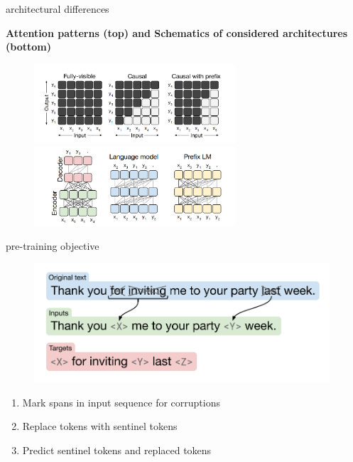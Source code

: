 
\begin{frame}{architectural differences}

\vfill
	
	\textbf{Attention patterns (top) and Schematics of considered architectures (bottom)}
	
	\begin{figure}
		\centering
		\includegraphics[width = 7.5cm]{figure/63-mask-patterns.png}\\ 
		\includegraphics[width = 7.5cm]{figure/63-schematics.png}\\ 
	\end{figure}
	
\vfill

\end{frame}


\begin{frame}{pre-training objective}

\vfill
	
	\begin{figure}
		\centering
		\includegraphics[width = 11cm]{figure/63-t5-span-pred.png}\\ 
	\end{figure}
	
	\begin{enumerate}
		\item Mark spans in input sequence for corruptions
		\item Replace tokens with sentinel tokens
		\item Predict sentinel tokens and replaced tokens
	\end{enumerate}
	
\vfill

\end{frame}

